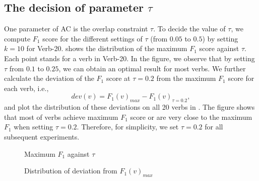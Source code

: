 \subsection{The decision of parameter $\tau$}
\label{sec:decision_tau}
One parameter of AC is the overlap constraint $\tau$.
To decide the value of $\tau$, we compute
$F_1$ score for the different settings of $\tau$ (from $0.05$ to $0.5$)
by setting $k=10$ for Verb-20.
 shows the distribution of the maximum $F_1$ score against $\tau$.
Each point stands for a verb in Verb-20.
In the figure, we observe that by setting $\tau$ from $0.1$ to $0.25$, we can obtain an optimal
result for most verbs.
We further calculate the deviation of the $F_1$ score at $\tau=0.2$
from the maximum $F_1$ score for each verb, i.e.,
\[dev(v) = F_1(v)_{max} - F_1(v)_{\tau=0.2},\] 
and plot the distribution of these deviations on all 20 verbs 
in .
The figure shows that most of verbs achieve maximum $F_1$ score
or are very close to the maximum $F_1$ when setting $\tau=0.2$.
Therefore, for simplicity, we set $\tau=0.2$ for all subsequent experiments.

\begin{figure}[th]
\begin{minipage}[t]{0.49\columnwidth}
\centering
{}
\caption{Maximum $F_1$ against $\tau$}
\label{fig:f1_vs_tau}
\end{minipage}
\hfill
\begin{minipage}[t]{0.49\columnwidth}
\centering
{}
\caption{Distribution of deviation from $F_1(v)_{max}$}
\label{fig:variance}
\end{minipage}
\end{figure}

